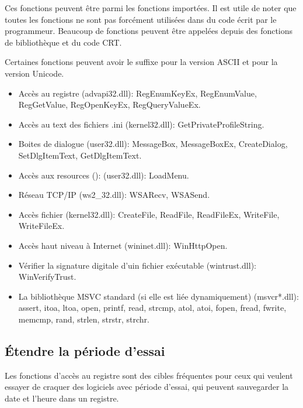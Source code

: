Ces fonctions peuvent être parmi les fonctions importées.
Il est utile de noter que toutes les fonctions ne sont pas forcément utilisées dans
du code écrit par le programmeur.
Beaucoup de fonctions peuvent être appelées depuis des fonctions de bibliothèque
et du code \ac{CRT}.

Certaines fonctions peuvent avoir le suffixe  pour la version ASCII et 
pour la version Unicode.

\begin{itemize}

\item
Accès au registre (advapi32.dll): 
RegEnumKeyEx, RegEnumValue, RegGetValue, RegOpenKeyEx, RegQueryValueEx.

\item
Accès au text des fichiers .ini (kernel32.dll):
GetPrivateProfileString.

\item
Boites de dialogue (user32.dll):
MessageBox, MessageBoxEx, CreateDialog, SetDlgItemText, GetDlgItemText.

\item
Accès aux resources (): (user32.dll): LoadMenu.

\item
Réseau TCP/IP (ws2\_32.dll):
WSARecv, WSASend.

\item
Accès fichier (kernel32.dll):
CreateFile, ReadFile, ReadFileEx, WriteFile, WriteFileEx.

\item
Accès haut niveau à Internet (wininet.dll):
WinHttpOpen.

\item
Vérifier la signature digitale d'uin fichier exécutable (wintrust.dll):
WinVerifyTrust.

\item
La bibliothèque MSVC standard (si elle est liée dynamiquement) (msvcr*.dll):
assert, itoa, ltoa, open, printf, read, strcmp, atol, atoi, fopen, fread, fwrite, memcmp, rand,
strlen, strstr, strchr.

\end{itemize}

\subsection{Étendre la période d'essai}

Les fonctions d'accès au registre sont des cibles fréquentes pour ceux qui veulent
essayer de craquer des logiciels avec période d'essai, qui peuvent sauvegarder la
date et l'heure dans un registre.

